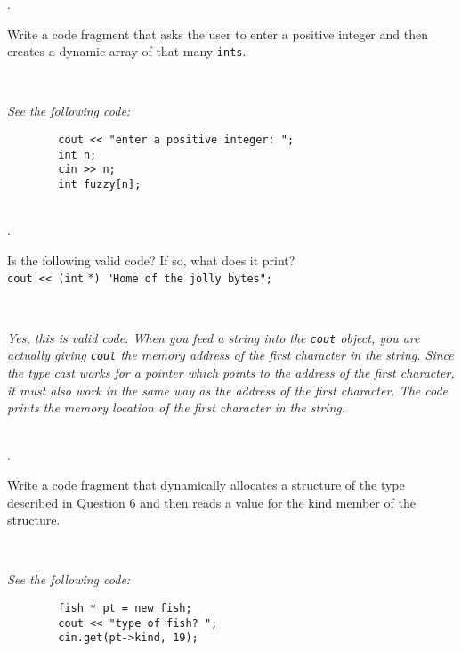 \documentclass{amsart}
\begin{document}
. 
\begin{minipage}[t]{11.5 cm}
	Write a code fragment that asks the user to enter a positive integer and then creates a dynamic array of that many \texttt{ints}.
\end{minipage} \\
\phantom{3. } 
\begin{minipage}[t]{11.5 cm}
	{\slshape See the following code:}
	\begin{verbatim}
		cout << "enter a positive integer: ";
		int n; 
		cin >> n;
		int fuzzy[n];
	\end{verbatim}
\end{minipage} 
\\[.2cm]

. 
\begin{minipage}[t]{11.5 cm}
	Is the following valid code? If so, what does it print? \\[.1 cm]
\verb+cout << (int+ *\verb+) "Home of the jolly bytes";+ \\[.1cm]
\end{minipage} \\
\phantom{3. } 
\begin{minipage}[t]{11.5 cm}
	{\slshape Yes, this is valid code. When you feed a string into the \texttt{cout} object, you are actually giving \texttt{cout} the memory address of the first character in the string. Since the type cast works for a pointer which points to the address of the first character, it must also work in the same way as the address of the first character. The code prints the memory location of the first character in the string. }
\end{minipage} 
\\[.2cm]

. 
\begin{minipage}[t]{11.5 cm}
	Write a code fragment that dynamically allocates a structure of the type described in Question 6 and then reads a value for the kind member of the structure. 
\end{minipage} \\[1ex]
\phantom{2. } 
\begin{minipage}[t]{11.5 cm}
	{\slshape See the following code:}
	\begin{verbatim}
		fish * pt = new fish;
		cout << "type of fish? ";
		cin.get(pt->kind, 19);
	\end{verbatim}
\end{minipage} 
\\[.2cm]
\end{document}
